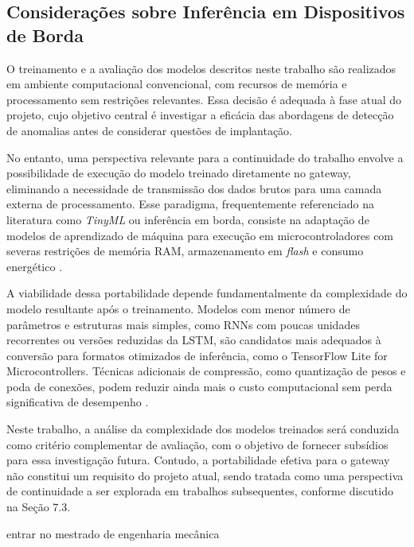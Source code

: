 
\subsection{Considerações sobre Inferência em Dispositivos de Borda}

O treinamento e a avaliação dos modelos descritos neste trabalho são 
realizados em ambiente computacional convencional, com recursos de memória e 
processamento sem restrições relevantes. Essa decisão é adequada à fase 
atual do projeto, cujo objetivo central é investigar a eficácia das 
abordagens de detecção de anomalias antes de considerar questões de 
implantação.

No entanto, uma perspectiva relevante para a continuidade do trabalho envolve 
a possibilidade de execução do modelo treinado diretamente no gateway, 
eliminando a necessidade de transmissão dos dados brutos para uma camada 
externa de processamento. Esse paradigma, frequentemente referenciado na 
literatura como \textit{TinyML} ou inferência em borda, consiste na adaptação 
de modelos de aprendizado de máquina para execução em microcontroladores com 
severas restrições de memória RAM, armazenamento em \textit{flash} e consumo 
energético \cite{ray2022}.

A viabilidade dessa portabilidade depende fundamentalmente da complexidade do 
modelo resultante após o treinamento. Modelos com menor número de parâmetros 
e estruturas mais simples, como RNNs com poucas unidades recorrentes ou 
versões reduzidas da LSTM, são candidatos mais adequados à conversão para 
formatos otimizados de inferência, como o TensorFlow Lite for 
Microcontrollers. Técnicas adicionais de compressão, como quantização de 
pesos e poda de conexões, podem reduzir ainda mais o custo computacional sem 
perda significativa de desempenho \cite{jacob2018}.

Neste trabalho, a análise da complexidade dos modelos treinados será 
conduzida como critério complementar de avaliação, com o objetivo de fornecer 
subsídios para essa investigação futura. Contudo, a portabilidade efetiva 
para o gateway não constitui um requisito do projeto atual, sendo tratada 
como uma perspectiva de continuidade a ser explorada em trabalhos 
subsequentes, conforme discutido na Seção 7.3.



entrar no mestrado de engenharia mecânica